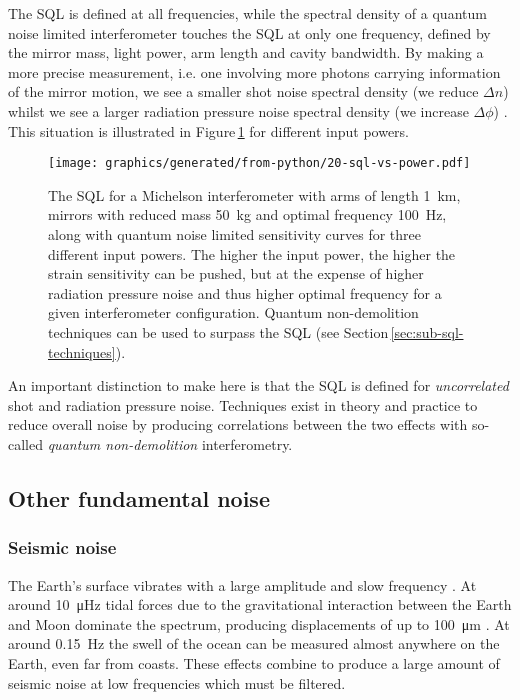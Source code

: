 The \gls{SQL} is defined at all frequencies, while the spectral density of a quantum noise limited interferometer touches the \gls{SQL} at only one frequency, defined by the mirror mass, light power, arm length and cavity bandwidth. By making a more precise measurement, i.e. one involving more photons carrying information of the mirror motion, we see a smaller shot noise spectral density (we reduce $\Delta n$) whilst we see a larger radiation pressure noise spectral density (we increase $\Delta \phi$) \cite{Caves1981}. This situation is illustrated in Figure\,\ref{fig:sql-vs-input-power} for different input powers.

\begin{figure}
  \centering
  \texttt{[image: graphics/generated/from-python/20-sql-vs-power.pdf]}
  \caption[Standard quantum limit and the quantum noise with various input powers]{\label{fig:sql-vs-input-power}The \gls{SQL} for a Michelson interferometer with arms of length \SI{1}{\kilo\meter}, mirrors with reduced mass \SI{50}{\kilo\gram} and optimal frequency \SI{100}{\hertz}, along with quantum noise limited sensitivity curves for three different input powers. The higher the input power, the higher the strain sensitivity can be pushed, but at the expense of higher radiation pressure noise and thus higher optimal frequency for a given interferometer configuration. Quantum non-demolition techniques can be used to surpass the \gls{SQL} (see Section\,\ref{sec:sub-sql-techniques}).}
\end{figure}

An important distinction to make here is that the \gls{SQL} is defined for \emph{uncorrelated} shot and radiation pressure noise. Techniques exist in theory and practice to reduce overall noise by producing correlations between the two effects with so-called \emph{quantum non-demolition} interferometry. 

\subsection{Other fundamental noise}

\subsubsection{\label{sec:seismic-noise}Seismic noise}
The Earth's surface vibrates with a large amplitude and slow frequency \cite{ET2011}. At around \SI{10}{\micro\hertz} tidal forces due to the gravitational interaction between the Earth and Moon dominate the spectrum, producing displacements of up to \SI{100}{\micro\meter} \cite{Adhikari2004}. At around \SI{0.15}{\hertz} the swell of the ocean can be measured almost anywhere on the Earth, even far from coasts. These effects combine to produce a large amount of seismic noise at low frequencies which must be filtered.

